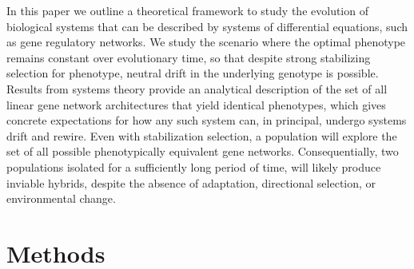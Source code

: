 \documentclass{article}
\newcommand{\1}{\mathbbm{1}}
\begin{document}
In this paper we outline a theoretical framework to study the evolution of biological systems
that can be described by systems of differential equations, such as gene regulatory networks.
We study the scenario
where the optimal phenotype remains constant over evolutionary time,
so that despite strong stabilizing selection for phenotype,
neutral drift in the underlying genotype is possible.
Results from systems theory provide
an analytical description of the set of 
all linear gene network architectures that yield identical phenotypes,
which gives concrete expectations for how any such
system can, in principal, undergo systems drift and rewire. 
Even with stabilization selection, a population will explore the set of all possible phenotypically equivalent gene networks.
Consequentially, two populations isolated for a sufficiently long period of time, 
will likely produce inviable hybrids, despite the absence of adaptation, directional selection, or environmental change.

\section*{Methods}
\end{document}
